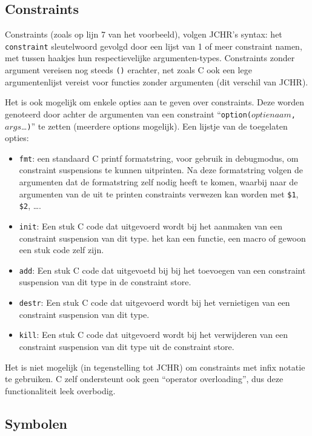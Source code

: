 \subsection{Constraints}

Constraints (zoals op lijn 7 van het voorbeeld), volgen JCHR's syntax: het {\tt constraint} sleutelwoord gevolgd door
een lijst van 1 of meer constraint namen, met tussen haakjes hun respectievelijke argumenten-types. Constraints zonder
argument vereisen nog steeds {\tt ()} erachter, net zoals C ook een lege argumentenlijst vereist voor functies zonder
argumenten (dit verschil van JCHR).

Het is ook mogelijk om enkele opties aan te geven over constraints. Deze worden genoteerd door achter de argumenten van
een constraint ``{\tt option(}$optienaam${\tt ,}$args$\ldots{\tt )}'' te zetten (meerdere options mogelijk). Een lijstje van de
toegelaten opties: \begin{itemize}
  \item {\tt fmt}: een standaard C printf formatstring, voor gebruik in debugmodus, om constraint suspensions te kunnen
    uitprinten. Na deze formatstring volgen de argumenten dat de formatstring zelf nodig heeft te komen, waarbij naar de
    argumenten van de uit te printen constraints verwezen kan worden met {\tt \$1}, {\tt \$2}, \ldots.
  \item {\tt init}: Een stuk C code dat uitgevoerd wordt bij het aanmaken van een constraint suspension van dit type.
    het kan een functie, een macro of gewoon een stuk code zelf zijn.
  \item {\tt add}: Een stuk C code dat uitgevoetd bij bij het toevoegen van een constraint suspension van dit type in de
    constraint store.
  \item {\tt destr}: Een stuk C code dat uitgevoerd wordt bij het vernietigen van een constraint suspension van dit type.
  \item {\tt kill}: Een stuk C code dat uitgevoerd wordt bij het verwijderen van een constraint suspension van dit type
    uit de constraint store.
\end{itemize}

Het is niet mogelijk (in tegenstelling tot JCHR) om constraints met infix notatie te gebruiken. C zelf ondersteunt ook
geen ``operator overloading'', dus deze functionaliteit leek overbodig.

\subsection{Symbolen}


